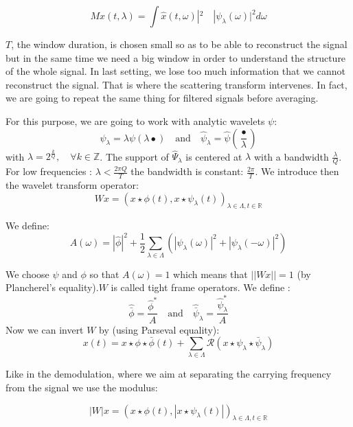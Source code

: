 \documentclass[onecolumn,12pt]{article}
\begin{document}
	\begin{equation}
		Mx(t,\lambda)=\int \hat{x}(t,\omega)|^2 \quad|\psi_{\lambda}(\omega)|^2 d\omega
	\end{equation}
	
	$T$, the window duration, is chosen small so as to be able to reconstruct the signal but in the same time we need a big window in order to understand the structure of the whole signal. In last setting, we lose too much information that we cannot reconstruct the signal. That is where the scattering transform intervenes. In fact, we are going to repeat the same thing for filtered signals before averaging.
	
	For this purpose, we are going to work with analytic wavelets $\psi$:
	$$\psi_{\lambda}=\lambda \psi(\lambda \bullet) \quad \text{and} \quad \widehat{\psi}_{\lambda}= \widehat{\psi}(\frac{\bullet}{\lambda})$$ 
	with $\lambda =2^{\frac{k}{Q}},\quad \forall k \in \mathbb{Z}$. The support of $\widehat{\Psi}_{\lambda}$ is centered at $\lambda$ with a bandwidth $\frac{\lambda}{Q}$. For low frequencies : $\lambda <\frac{2 \pi Q}{T}$ the bandwidth is constant: $\frac{2\pi}{T}$. 
	We introduce then the wavelet transform operator:
	\begin{equation}
		W x=(x\star \phi(t), x \star \psi_{\lambda}(t))_{\lambda \in \Lambda,t \in \mathbb{R}}
	\end{equation}
	
	We define:\\
	
	\begin{equation}
		A(\omega)=|\widehat{\phi}|^2+ \frac{1}{2} \sum_{\lambda \in \Lambda} (|\psi_{\lambda}(\omega)|^2 +|\psi_{\lambda}(-\omega)|^2)
	\end{equation}
	
	
		We choose $\psi$ and $\phi$ so that $A(\omega)=1$ which means that $||Wx||=1$ (by Plancherel's equality).$W$ is called tight frame operators. We define :
		$$\widehat{\bar{\phi}}=\frac{\widehat{\phi}^*}{A}\quad \text{and} \quad \widehat{\bar{\psi}}_{\lambda}=\frac{\widehat{\psi}_{\lambda}^*}{A}$$
		Now we can invert $W$ by (using Parseval equality):
		$$x(t)=x\star \phi \star \bar{\phi}(t) + \sum_{\lambda \in \Lambda} \mathscr{R}(x\star \psi_{\lambda} \star \bar{\psi}_{\lambda})$$
		
		Like in the demodulation, where we aim at separating the carrying frequency from the signal we use the modulus:
		
		$$|W| x= (x\star \phi(t), |x \star \psi_{\lambda}(t)|)_{\lambda \in \Lambda,t \in \mathbb{R}}$$
		
\end{document}
